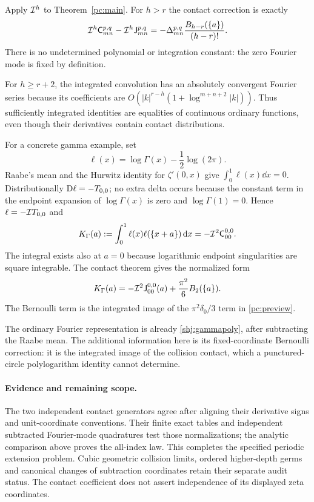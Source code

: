 \begin{corollary}\label{pc:primitivecor}
Apply $\mathcal I^h$ to Theorem~\ref{pc:main}. For $h>r$ the contact correction is exactly
\begin{equation}\label{pc:bernoulli}
 \mathcal I^h\mathsf C_{mn}^{p,q}-\mathcal I^h\mathsf J_{mn}^{p,q}
 =-\Delta_{mn}^{p,q}\frac{B_{h-r}(\{a\})}{(h-r)!}.
\end{equation}
There is no undetermined polynomial or integration constant: the zero Fourier mode is fixed by definition.
\end{corollary}
For $h\ge r+2$, the integrated convolution has an absolutely convergent Fourier series because its coefficients are
$O(|k|^{r-h}(1+\log^{m+n+2}|k|))$. Thus sufficiently integrated identities are equalities of continuous ordinary functions, even though their derivatives contain contact distributions.

For a concrete gamma example, set
\[
 \ell(x)=\log\Gamma(x)-\frac12\log(2\pi).
\]
Raabe's mean and the Hurwitz identity for $\zeta'(0,x)$ give $\int_0^1\ell(x)\dd x=0$. Distributionally $\mathrm D\ell=-T_{0,0}$; no extra delta occurs because the constant term in the endpoint expansion of $\log\Gamma(x)$ is zero and $\log\Gamma(1)=0$. Hence $\ell=-\mathcal I T_{0,0}$ and
\begin{equation}\label{pc:loggammacov}
 K_\Gamma(a):=\int_0^1\ell(x)\ell(\{x+a\})\,\mathrm d x
 =-\mathcal I^2\mathsf C_{00}^{0,0}.
\end{equation}
The integral exists also at $a=0$ because logarithmic endpoint singularities are square integrable. The contact theorem gives the normalized form
\begin{equation}\label{pc:gammaBernoulli}
 K_\Gamma(a)=-\mathcal I^2\mathsf J_{00}^{0,0}(a)+\frac{\pi^2}{6}B_2(\{a\}).
\end{equation}
The Bernoulli term is the integrated image of the $\pi^2\delta_0/3$ term in \eqref{pc:preview}.

The ordinary Fourier representation is already
\eqref{shj:gammapoly}, after subtracting the Raabe mean. The additional
information here is its fixed-coordinate Bernoulli correction: it is the
integrated image of the collision contact, which a punctured-circle
polylogarithm identity cannot determine.

\paragraph{Evidence and remaining scope.}
The two independent contact generators agree after aligning their
derivative signs and unit-coordinate conventions. Their finite exact
tables and independent subtracted Fourier-mode quadratures test those
normalizations; the analytic comparison above proves the all-index law.
This completes the specified periodic extension problem. Cubic geometric
collision limits, ordered higher-depth germs and canonical changes of
subtraction coordinates retain their separate audit status. The contact
coefficient does not assert independence of its displayed zeta coordinates.
